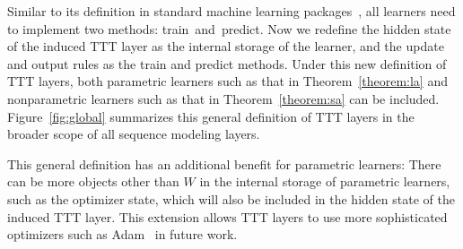 \documentclass{article}
\begin{document}
Similar to its definition in standard machine learning packages~\cite{scikit-learn}, all learners need to implement two methods: \mbox{train and predict.}
Now we redefine the hidden state of the induced TTT layer as the internal storage of the learner, and the update and output rules as the train and predict methods.
Under this new definition of TTT layers, both parametric learners such as that in Theorem~\ref{theorem:la} and nonparametric learners such as that in Theorem~\ref{theorem:sa} can be included.
Figure~\ref{fig:global} summarizes this general definition of TTT layers in the broader scope of all sequence modeling layers.

This general definition has an additional benefit for parametric learners: 
There can be more objects other than $W$ in the internal storage of parametric learners, such as the optimizer state, which will also be included in the hidden state of the induced TTT layer.
This extension allows TTT layers to use more sophisticated optimizers such as Adam~\cite{kingma2014adam} in future work. 
\end{document}
